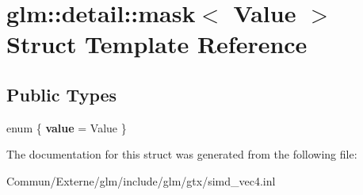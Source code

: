 \hypertarget{structglm_1_1detail_1_1mask}{}\section{glm\+:\+:detail\+:\+:mask$<$ Value $>$ Struct Template Reference}
\label{structglm_1_1detail_1_1mask}
\subsection*{Public Types}
\begin{DoxyCompactItemize}
\item 
enum \{ {\bfseries value} = Value
 \}\hypertarget{structglm_1_1detail_1_1mask_a5e277eeead970529af6af3afaa8dcac0}{}\label{structglm_1_1detail_1_1mask_a5e277eeead970529af6af3afaa8dcac0}

\end{DoxyCompactItemize}


The documentation for this struct was generated from the following file\+:\begin{DoxyCompactItemize}
\item 
Commun/\+Externe/glm/include/glm/gtx/simd\+\_\+vec4.\+inl\end{DoxyCompactItemize}
